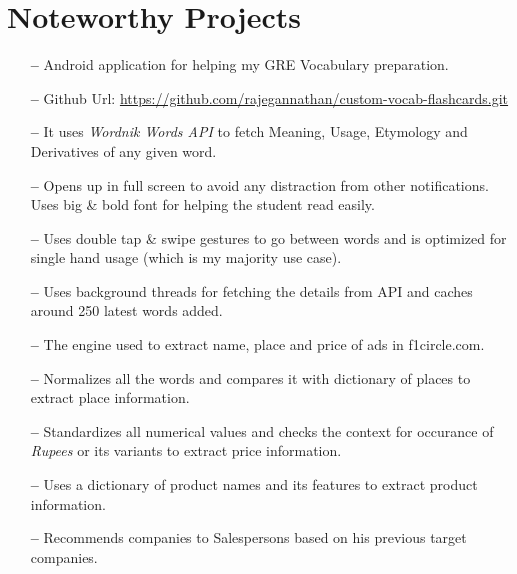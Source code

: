 \documentclass{cv}
\begin{document}
\section{Noteworthy Projects}
\begin{description}[leftmargin=50pt,labelwidth=50pt]
  \item[Gre Wordcards] \hfill
    \begin{itemize}[label={},leftmargin=10pt,topsep=0pt,partopsep=0pt]
      \item[\textbf{--}] Android application for helping my GRE Vocabulary preparation.
      \item[\textbf{--}] Github Url: \url{https://github.com/rajegannathan/custom-vocab-flashcards.git}
      \item[\textbf{--}] It uses \textit{Wordnik Words API} to fetch Meaning, Usage, Etymology and Derivatives of any given word.
      \item[\textbf{--}] Opens up in full screen to avoid any distraction from other notifications.  Uses big \& bold font for helping the student read easily.
      \item[\textbf{--}] Uses double tap \& swipe gestures to go between words and is optimized for single hand usage (which is my majority use case).
      \item[\textbf{--}] Uses background threads for fetching the details from API and caches around 250 latest words added.
    \end{itemize}
  \item[Information Extraction Engine] \hfill
    \begin{itemize}[label={},leftmargin=10pt,topsep=0pt]
      \item[\textbf{--}] The engine used to extract name, place and price of ads in f1circle.com.
      \item[\textbf{--}] Normalizes all the words and compares it with dictionary of places to extract place information.
      \item[\textbf{--}] Standardizes all numerical values and checks the context for occurance of \textit{Rupees} or its variants to extract price information.
      \item[\textbf{--}] Uses a dictionary of product names and its features to extract product information.
    \end{itemize}
  \item[Company Recommendation System] \hfill
    \begin{itemize}[label={},leftmargin=10pt,topsep=0pt]
      \item[\textbf{--}] Recommends companies to Salespersons based on his previous target companies.

\end{itemize}
\end{description}
\end{document}
